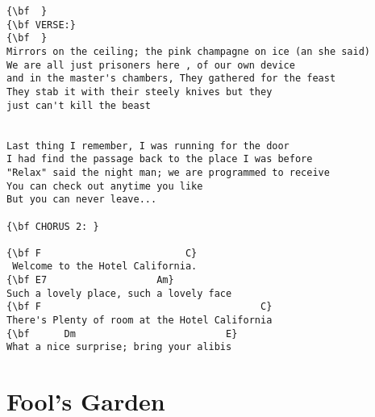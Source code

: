 \documentclass[a4paper]{article}
\begin{document}
\begin{Verbatim}[commandchars=\\\{\}]
{\bf  }
{\bf VERSE:}
{\bf  }
Mirrors on the ceiling; the pink champagne on ice (an she said)
We are all just prisoners here , of our own device
and in the master's chambers, They gathered for the feast
They stab it with their steely knives but they
just can't kill the beast


Last thing I remember, I was running for the door
I had find the passage back to the place I was before 
"Relax" said the night man; we are programmed to receive
You can check out anytime you like
But you can never leave...  

{\bf CHORUS 2: }

{\bf F                         C}
 Welcome to the Hotel California.
{\bf E7                   Am}
Such a lovely place, such a lovely face
{\bf F                                      C}
There's Plenty of room at the Hotel California
{\bf      Dm                          E}
What a nice surprise; bring your alibis
\end{Verbatim}
\newpage
\section{Fool's Garden} %
\label{sec:Fool's Garde}
\end{document}
